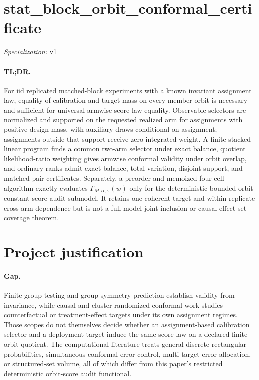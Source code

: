 \documentclass{article}
\begin{document}
\sloppy

\section*{stat\_\allowbreak{}block\_\allowbreak{}orbit\_\allowbreak{}conformal\_\allowbreak{}certificate}

\noindent\textit{Specialization:} v1\par

\paragraph{TL;DR.} For iid replicated matched-block experiments with a known invariant assignment law, equality of calibration and target mass on every member orbit is necessary and sufficient for universal armwise score-law equality. Observable selectors are normalized and supported on the requested realized arm for assignments with positive design mass, with auxiliary draws conditional on assignment; assignments outside that support receive zero integrated weight. A finite stacked linear program finds a common two-arm selector under exact balance, quotient likelihood-ratio weighting gives armwise conformal validity under orbit overlap, and ordinary ranks admit exact-balance, total-variation, disjoint-support, and matched-pair certificates. Separately, a preorder and memoized four-cell algorithm exactly evaluates \(\Gamma_{M,\alpha,\boldsymbol\varepsilon}(w)\) only for the deterministic bounded orbit-constant-score audit submodel. It retains one coherent target and within-replicate cross-arm dependence but is not a full-model joint-inclusion or causal effect-set coverage theorem.

\section{Project justification}

\paragraph{Gap.} Finite-group testing and group-symmetry prediction establish validity from invariance, while causal and cluster-randomized conformal work studies counterfactual or treatment-effect targets under its own assignment regimes. Those scopes do not themselves decide whether an assignment-based calibration selector and a deployment target induce the same score law on a declared finite orbit quotient. The computational literature treats general discrete rectangular probabilities, simultaneous conformal error control, multi-target error allocation, or structured-set volume, all of which differ from this paper's restricted deterministic orbit-score audit functional.
\end{document}
